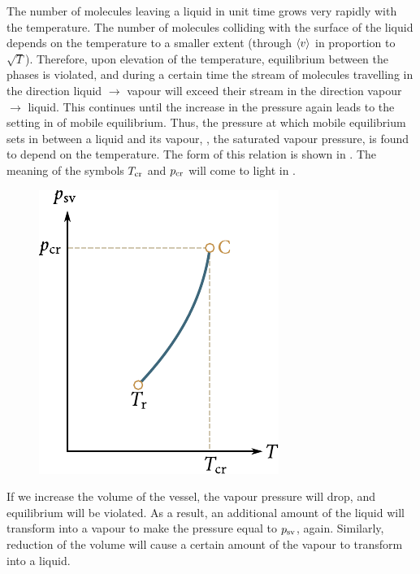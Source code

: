 The number of molecules leaving a liquid in unit time grows very rapidly with the temperature. The number of molecules colliding with the surface of the liquid depends on the temperature to a smaller extent (through $\left\langle v \right\rangle$ in proportion to $\sqrt{T}$). Therefore, upon elevation of the temperature, equilibrium between the phases is violated, and during a certain time the stream of molecules travelling in the direction liquid $\to$ vapour will exceed their stream in the direction vapour $\to$ liquid. This continues until the increase in the pressure again leads to the setting in of mobile equilibrium. Thus, the pressure at which mobile equilibrium sets in between a liquid and its vapour, \ie, the saturated vapour pressure, is found to depend on the temperature. The form of this relation is shown in . The meaning of the symbols $T_{\text{cr}}$ and $p_{\text{cr}}$ will come to light in .

\begin{figure}[t]
	\begin{center}
		\includegraphics[scale=0.95]{figures/ch_15/fig_15_2.pdf}
		\caption[]{}
		\label{fig:15_2}
	\end{center}
	\vspace{-0.8cm}
\end{figure}

If we increase the volume of the vessel, the vapour pressure will drop, and equilibrium will be violated. As a result, an additional amount of the liquid will transform into a vapour to make the pressure equal to $p_{\text{sv}}$, again. Similarly, reduction of the volume will cause a certain amount of the vapour to transform into a liquid.

